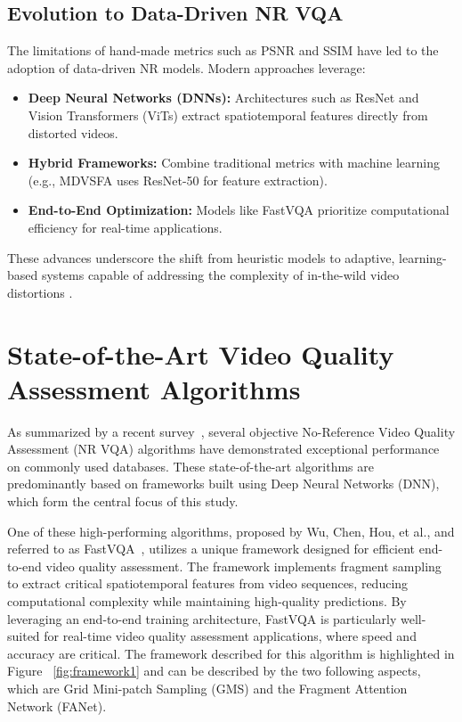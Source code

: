 \subsection{Evolution to Data-Driven NR VQA}  
The limitations of hand-made metrics such as PSNR and SSIM have led to the adoption of data-driven NR models. Modern approaches leverage:  
\begin{itemize}  
    \item \textbf{Deep Neural Networks (DNNs):} Architectures such as ResNet \cite{he2016deep} and Vision Transformers (ViTs) \cite{dosovitskiy2020image} extract spatiotemporal features directly from distorted videos.  
    \item \textbf{Hybrid Frameworks:} Combine traditional metrics with machine learning (e.g., MDVSFA \cite{li2023unified} uses ResNet-50 for feature extraction).  
    \item \textbf{End-to-End Optimization:} Models like FastVQA \cite{wu2022fastvqa} prioritize computational efficiency for real-time applications.  
\end{itemize}  
These advances underscore the shift from heuristic models to adaptive, learning-based systems capable of addressing the complexity of in-the-wild video distortions \cite{min2024perceptual}. 

\section{State-of-the-Art Video Quality Assessment Algorithms}\label{sec:se21}

As summarized by a recent survey~\cite{min2024perceptual}, several objective No-Reference Video Quality Assessment (NR VQA) algorithms have demonstrated exceptional performance on commonly used databases. These state-of-the-art algorithms are predominantly based on frameworks built using Deep Neural Networks (DNN), which form the central focus of this study. 

One of these high-performing algorithms, proposed by Wu, Chen, Hou, et al., and referred to as FastVQA~\cite{wu2022fastvqa}, utilizes a unique framework designed for efficient end-to-end video quality assessment. The framework implements fragment sampling to extract critical spatiotemporal features from video sequences, reducing computational complexity while maintaining high-quality predictions. By leveraging an end-to-end training architecture, FastVQA is particularly well-suited for real-time video quality assessment applications, where speed and accuracy are critical. The framework described for this algorithm is highlighted in Figure ~\ref{fig:framework1} and can be described by the two following aspects, which are Grid Mini-patch Sampling (GMS) and the Fragment Attention Network (FANet).

